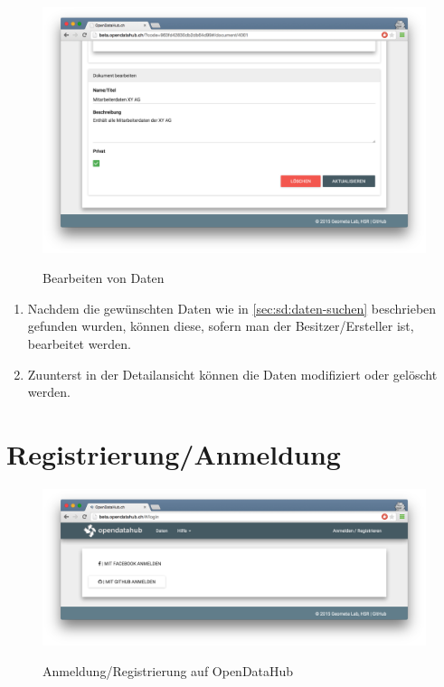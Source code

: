 \begin{figure}[H]
	\centering
	\includegraphics[width=\linewidth]{fig/screenshot-daten-bearbeiten}
	\label{fig:sd:screenshot-daten-bearbeiten}
	\caption{Bearbeiten von Daten}
\end{figure}


\begin{enumerate}
\item Nachdem die gewünschten Daten wie in \cref{sec:sd:daten-suchen} beschrieben gefunden wurden, können diese, sofern man der Besitzer/Ersteller ist, bearbeitet werden.
\item Zuunterst in der Detailansicht können die Daten modifiziert oder gelöscht werden.
\end{enumerate}


\section{Registrierung/Anmeldung}
\label{sec:sd:anmeldung}

\begin{figure}[H]
	\centering
	\includegraphics[width=\linewidth]{fig/screenshot-anmelden}
	\label{fig:sd:screenshot-anmelden}
	\caption{Anmeldung/Registrierung auf OpenDataHub}
\end{figure}

